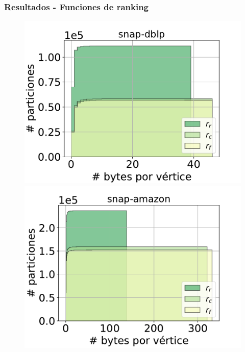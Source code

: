 \begin{frame}%
\frametitle{Resultados - Funciones de ranking}

\begin{figure}
    \centering
    	\begin{minipage}{1\textwidth}
    		\centering
    		\begin{minipage}{0.45\textwidth}
    			\centering
    			\includegraphics[width=1\linewidth]{../img/cdf/snap-dblp.pdf}
    		\end{minipage}
    		\begin{minipage}{0.45\textwidth}
    			\centering
    			\includegraphics[width=1\linewidth]{../img/cdf/snap-amazon.pdf}
    		\end{minipage}  		
    	\end{minipage}
    	

\end{figure}
\end{frame}
